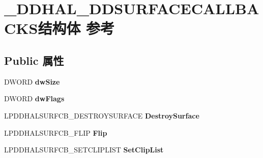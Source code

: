 \hypertarget{struct___d_d_h_a_l___d_d_s_u_r_f_a_c_e_c_a_l_l_b_a_c_k_s}{}\section{\+\_\+\+D\+D\+H\+A\+L\+\_\+\+D\+D\+S\+U\+R\+F\+A\+C\+E\+C\+A\+L\+L\+B\+A\+C\+K\+S结构体 参考}
\label{struct___d_d_h_a_l___d_d_s_u_r_f_a_c_e_c_a_l_l_b_a_c_k_s}
\subsection*{Public 属性}
\begin{DoxyCompactItemize}
\item 
\mbox{\label{struct___d_d_h_a_l___d_d_s_u_r_f_a_c_e_c_a_l_l_b_a_c_k_s_ac614e900a0398e3d13c423a6bf693507}} 
D\+W\+O\+RD {\bfseries dw\+Size}
\item 
\mbox{\label{struct___d_d_h_a_l___d_d_s_u_r_f_a_c_e_c_a_l_l_b_a_c_k_s_a94e3c3bac30ed8c765ec068345e7db89}} 
D\+W\+O\+RD {\bfseries dw\+Flags}
\item 
\mbox{\label{struct___d_d_h_a_l___d_d_s_u_r_f_a_c_e_c_a_l_l_b_a_c_k_s_ac8793cc7103aecfe45554d1e646a9fd2}} 
L\+P\+D\+D\+H\+A\+L\+S\+U\+R\+F\+C\+B\+\_\+\+D\+E\+S\+T\+R\+O\+Y\+S\+U\+R\+F\+A\+CE {\bfseries Destroy\+Surface}
\item 
\mbox{\label{struct___d_d_h_a_l___d_d_s_u_r_f_a_c_e_c_a_l_l_b_a_c_k_s_a59f68177be840c5b05c1f3f1cb5c877a}} 
L\+P\+D\+D\+H\+A\+L\+S\+U\+R\+F\+C\+B\+\_\+\+F\+L\+IP {\bfseries Flip}
\item 
\mbox{\label{struct___d_d_h_a_l___d_d_s_u_r_f_a_c_e_c_a_l_l_b_a_c_k_s_a319dac08a2e65af6e1c87d1017d611cf}} 
L\+P\+D\+D\+H\+A\+L\+S\+U\+R\+F\+C\+B\+\_\+\+S\+E\+T\+C\+L\+I\+P\+L\+I\+ST {\bfseries Set\+Clip\+List}
\item 
\mbox{\label{struct___d_d_h_a_l___d_d_s_u_r_f_a_c_e_c_a_l_l_b_a_c_k_s_a252751bcfa96816840a8438d3d6b4c27}} 

\end{DoxyCompactItemize}
